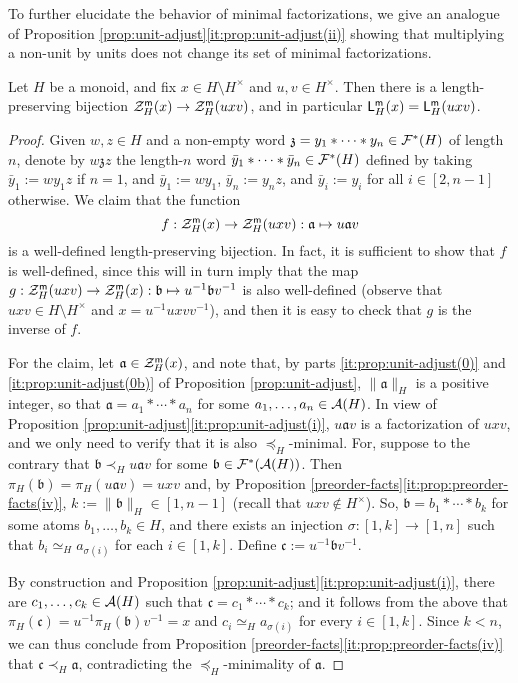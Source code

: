 %
To further elucidate the behavior of minimal factorizations, we give an analogue of Proposition \ref{prop:unit-adjust}\ref{it:prop:unit-adjust(ii)} showing that multiplying a non-unit by units does not change its set of minimal factorizations.
%
\begin{lemma}\label{lem:min-unit-adjust}
	Let $H$ be a monoid, and fix $x\in H\setminus H^\times$ and $u,v\in H^\times$.
	Then there is a length-preserving bijection $\mathcal{Z}_H^{\mathsf{m}}(x)\to\mathcal{Z}_H^{\mathsf{m}}(uxv)$, and in particular $\mathsf L_H^{\mathsf{m}}(x) = \mathsf L_H^{\mathsf{m}}(uxv)$.
\end{lemma}
\begin{proof}
	Given $w, z \in H$ and a non-empty word $\mathfrak{z} = y_1 \ast \cdots \ast y_n \in \mathcal{F}^\ast(H)$ of length $n$, denote by $w\mathfrak{z}z$ the length-$n$ word $\bar{y}_1 \ast \cdots \ast \bar{y}_n \in \mathcal{F}^\ast(H)$ defined by taking $\bar{y}_1 := w y_1 z$ if $n = 1$, and $\bar{y}_1:= wy_1$, $\bar{y}_n := y_nz$, and $\bar{y}_i := y_i$ for all $i\in [ 2,n-1]$ otherwise. 
	We claim that the function 
	$$
	f: \mathcal{Z}_H^{\mathsf{m}}(x) \to \mathcal{Z}_H^{\mathsf{m}}(uxv): \mathfrak a \mapsto u\mathfrak a v
	$$
	is a well-defined length-preserving bijection. 
	In fact, it is sufficient to show that $f$ is well-defined, since this will in turn imply that the map $g: \mathcal{Z}_H^{\mathsf{m}}(uxv)\to\mathcal{Z}_H^{\mathsf{m}}(x):\mathfrak{b}\mapsto u^{-1}\mathfrak{b}v^{-1}$ is also well-defined (observe that $uxv \in H \setminus H^\times$ and $x = u^{-1} uxv v^{-1}$), and then it is easy to check that $g$ is the inverse of $f$.
	
	For the claim, let $\mathfrak a \in \mathcal{Z}_H^{\mathsf{m}}(x)$, and note that, by parts \ref{it:prop:unit-adjust(0)} and \ref{it:prop:unit-adjust(0b)} of Proposition \ref{prop:unit-adjust}, $\|\mathfrak a\|_H$ is a positive integer, so that  $\mathfrak a = a_1 \ast \cdots \ast a_n$ for some $a_1, \ldots, a_n \in \mathcal{A}(H)$. 
	In view of Proposition \ref{prop:unit-adjust}\ref{it:prop:unit-adjust(i)}, $u\mathfrak{a}v$ is a factorization of $uxv$, and we only need to verify that it is also $\preceq_H$-minimal. For,
suppose to the contrary that $\mathfrak b \prec_H u\mathfrak av$ for some $\mathfrak b \in \mathcal{F}^\ast(\mathcal{A}(H))$.
	Then $\pi_H(\mathfrak b) = \pi_H(u\mathfrak a v) = uxv$ and, by Proposition \ref{preorder-facts}\ref{it:prop:preorder-facts(iv)},
	$
	k := \|\mathfrak b\|_H \in [ 1, n-1 ]
	$
	(recall that $uxv \notin H^\times$). So, $\mathfrak b = b_1 \ast \cdots \ast b_k$ for some atoms  $b_1, \ldots, b_k \in H$, and there exists an injection $\sigma: [ 1, k ] \to [ 1, n ]$ such that $b_i \simeq_H a_{\sigma(i)}$ for each $i \in [ 1, k ]$.
	Define
	$
	\mathfrak{c} := u^{-1} \mathfrak b v^{-1}$. 
	
	By construction and Proposition \ref{prop:unit-adjust}\ref{it:prop:unit-adjust(i)}, there are  $c_1, \ldots, c_k \in \mathcal{A}(H)$ such that $\mathfrak c = c_1 \ast \cdots \ast c_k$; and it follows from the above that $\pi_H(\mathfrak c) = u^{-1} \pi_H(\mathfrak b) v^{-1} = x$ and $c_i \simeq_H a_{\sigma(i)}$ for every $i \in [ 1, k ]$. Since $k < n$, we can thus conclude from Proposition \ref{preorder-facts}\ref{it:prop:preorder-facts(iv)} that $\mathfrak c \prec_H \mathfrak a$, contradicting the $\preceq_H$-minimality of $\mathfrak{a}$.
\end{proof}
